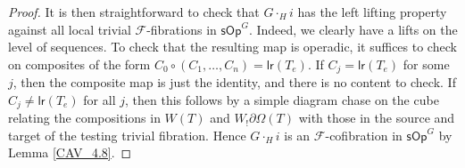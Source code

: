 \documentclass[a4paper,10pt
,draft
]{article}%
\numberwithin{equation}{section}
\numberwithin{figure}{section}
\theoremstyle{definition} %
\newcommand{\sOp}{\ensuremath{\mathsf{sOp}}}%
\newcommand{\F}{\ensuremath{\mathcal F}}
\newcommand{\1}{\ensuremath{\mathbbm 1}}%
\begin{document}
\begin{proof}
{      } %
      It is then straightforward to check that $G \cdot_H i$ has the left lifting property against all local trivial $\F$-fibrations in $\sOp^G$.
      {\color{OliveGreen} %
        Indeed, we clearly have a lifts on the level of sequences.
        To check that the resulting map is operadic, it suffices to check on composites of the form
        $C_0 \circ (C_1, \dots, C_n) = \mathsf{lr}(T_e)$.
        If $C_j = \mathsf{lr}(T_e)$ for some $j$, then the composite map is just the identity, and there is no content to check.
        If $C_j \neq \mathsf{lr}(T_e)$ for all $j$,
        then this follows by a simple diagram chase on the cube relating the compositions in $W(T)$ and $W_! \partial \Omega(T)$ with those in the source and target of the testing trivial fibration.
      } %
      Hence $G \cdot_H i$ is an $\F$-cofibration in $\sOp^G$ by Lemma \ref{CAV_4.8}.
      

\end{proof}
\end{document}
